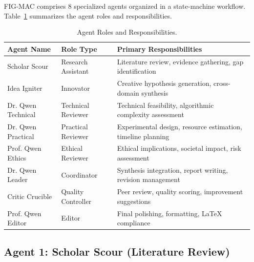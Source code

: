 FIG-MAC comprises 8 specialized agents organized in a state-machine workflow. Table~\ref{tab:agent_roles_app} summarizes the agent roles and responsibilities.

\begin{table}[h]
\centering
\small
\begin{tabular}{llp{6cm}}
\toprule
\textbf{Agent Name} & \textbf{Role Type} & \textbf{Primary Responsibilities} \\
\midrule
Scholar Scour & Research Assistant & Literature review, evidence gathering, gap identification \\
Idea Igniter & Innovator & Creative hypothesis generation, cross-domain synthesis \\
Dr. Qwen Technical & Technical Reviewer & Technical feasibility, algorithmic complexity assessment \\
Dr. Qwen Practical & Practical Reviewer & Experimental design, resource estimation, timeline planning \\
Prof. Qwen Ethics & Ethical Reviewer & Ethical implications, societal impact, risk assessment \\
Dr. Qwen Leader & Coordinator & Synthesis integration, report writing, revision management \\
Critic Crucible & Quality Controller & Peer review, quality scoring, improvement suggestions \\
Prof. Qwen Editor & Editor & Final polishing, formatting, LaTeX compliance \\
\bottomrule
\end{tabular}
\caption{Agent Roles and Responsibilities.}
\label{tab:agent_roles_app}
\end{table}

\subsection{Agent 1: Scholar Scour (Literature Review)}

